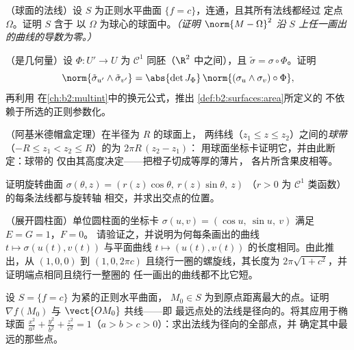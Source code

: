 \begin{exercise}[$\star\star\star$]\label{exo:b2:surfaces:7}
（球面的法线）设 $S$ 为正则水平曲面
$\{f = c\}$，连通，且其所有法线都经过
定点 $\Omega$。证明 $S$ 含于
以 $\Omega$ 为球心的球面中。\emph{（证明 $\norm{M - \Omega}^2$
沿 $S$ 上任一画出的曲线的导数为零。）}
\end{exercise}

\begin{exercise}[$\star\star\star$]\label{exo:b2:surfaces:8}
（是几何量）设 $\Phi \colon U' \to U$ 为 $\mathcal{C}^1$
同胚（$\R^2$ 中之间），且 $\tilde\sigma =
\sigma \circ \Phi$。证明
\[
\norm{\tilde\sigma_{u'} \wedge \tilde\sigma_{v'}}
= \abs{\det J_\Phi}\,
\norm{(\sigma_u \wedge \sigma_v)\circ\Phi} ,
\]
再利用
在\cref{ch:b2:multint}中的换元公式，推出
\cref{def:b2:surfaces:area}所定义的
不依赖于所选的正则参数化。
\end{exercise}

\begin{exercise}[$\star$]\label{exo:b2:surfaces:9}
（阿基米德帽盒定理）在半径为 $R$ 的球面上，
两纬线（$z_1 \leq z \leq z_2$）之间的\emph{球带}
（$-R \leq z_1 < z_2 \leq R$）的为 $2\pi R\,(z_2 - z_1)$：
用球面坐标卡证明它，并由此断定：球带的
仅由其高度决定——把橙子切成等厚的薄片，
各片所含果皮相等。
\end{exercise}

\begin{exercise}[$\star\star$]\label{exo:b2:surfaces:10}
证明旋转曲面
$\sigma(\theta, z) = (r(z)\cos\theta,\ r(z)\sin\theta,\ z)$
（$r > 0$ 为 $\mathcal C^1$ 类函数）的每条法线都与旋转轴
相交，并求出交点的位置。
\end{exercise}

\begin{exercise}[$\star\star$]\label{exo:b2:surfaces:11}
（展开圆柱面）单位圆柱面的坐标卡 $\sigma(u, v) = (\cos u,\
\sin u,\ v)$ 满足 $E = G = 1$，$F = 0$。
请验证之，并说明为何每条画出的曲线 $t \mapsto
\sigma(u(t), v(t))$ 与平面曲线 $t
\mapsto (u(t), v(t))$ 的长度相同。由此推出，从 $(1, 0, 0)$
到 $(1, 0, 2\pi c)$ 且绕行一圈的螺旋线，其长度为
$2\pi\sqrt{1 + c^2}$，并证明端点相同且绕行一整圈的
任一画出的曲线都不比它短。
\end{exercise}

\begin{exercise}[$\star\star\star$]\label{exo:b2:surfaces:12}
设 $S = \{f = c\}$ 为紧的正则水平曲面，
$M_0 \in S$ 为到原点距离最大的点。证明
$\nabla f(M_0)$ 与 $\vect{OM_0}$ 共线——即
最远点处的法线是径向的。将其应用于椭球面
$\frac{x^2}{a^2} + \frac{y^2}{b^2} + \frac{z^2}{c^2} = 1$（$a >
b > c > 0$）：求出法线为径向的全部点，并
确定其中最远的那些点。
\end{exercise}

